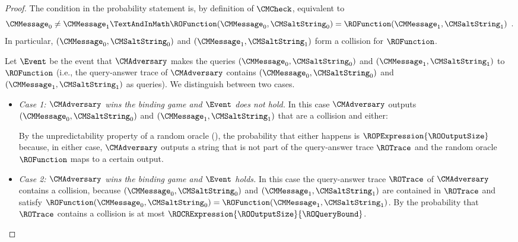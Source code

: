 \begin{proof}
The condition in the probability statement is, by definition of $\CMCheck$, equivalent to
\begin{equation*}
\CMMessage_{0} \neq \CMMessage_{1}
\TextAndInMath
\ROFunction(\CMMessage_{0},\CMSaltString_{0})
=
\ROFunction(\CMMessage_{1},\CMSaltString_{1})
\enspace.
\end{equation*}
In particular, $(\CMMessage_{0},\CMSaltString_{0})$ and $(\CMMessage_{1},\CMSaltString_{1})$ form a collision for $\ROFunction$.

Let $\Event$ be the event that $\CMAdversary$ makes the queries $(\CMMessage_{0},\CMSaltString_{0})$ and $(\CMMessage_{1},\CMSaltString_{1})$ to $\ROFunction$ (i.e., the query-answer trace of $\CMAdversary$ contains $(\CMMessage_{0},\CMSaltString_{0})$ and $(\CMMessage_{1},\CMSaltString_{1})$ as queries). We distinguish between two cases.
\begin{itemize}
  \item \emph{Case 1: $\CMAdversary$ wins the binding game and $\Event$ does not hold.} In this case $\CMAdversary$ outputs $(\CMMessage_{0},\CMSaltString_{0})$ and $(\CMMessage_{1},\CMSaltString_{1})$ that are a collision and either:
By the unpredictability property of a random oracle (), the probability that either happens is $\ROPExpression{\ROOutputSize}$ because, in either case, $\CMAdversary$ outputs a string that is not part of the query-answer trace $\ROTrace$ and the random oracle $\ROFunction$ maps to a certain output.

  \item \emph{Case 2: $\CMAdversary$ wins the binding game and $\Event$ holds.} In this case the query-answer trace $\ROTrace$ of $\CMAdversary$ contains a collision, because $(\CMMessage_{0},\CMSaltString_{0})$ and $(\CMMessage_{1},\CMSaltString_{1})$ are contained in $\ROTrace$ and satisfy $\ROFunction(\CMMessage_{0},\CMSaltString_{0}) = \ROFunction(\CMMessage_{1},\CMSaltString_{1})$. By  the probability that $\ROTrace$ contains a collision is at most $\ROCRExpression{\ROOutputSize}{\ROQueryBound}$.


\end{itemize}
\end{proof}
